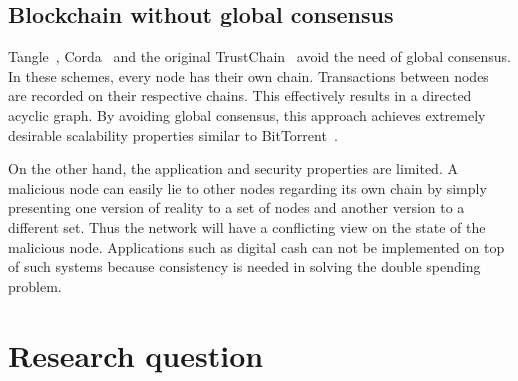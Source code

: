 \subsection{Blockchain without global consensus}

Tangle~\cite{tangle}, Corda~\cite{corda} and the original TrustChain~\cite{multichain} avoid the need of global consensus.
In these schemes, every node has their own chain.
Transactions between nodes are recorded on their respective chains.
This effectively results in a directed acyclic graph.
By avoiding global consensus, this approach achieves extremely desirable scalability properties similar to BitTorrent~\cite{cohen2003incentives}.

On the other hand, the application and security properties are limited.
A malicious node can easily lie to other nodes regarding its own chain by simply presenting one version of reality to a set of nodes and another version to a different set.
Thus the network will have a conflicting view on the state of the malicious node.
Applications such as digital cash can not be implemented on top of such systems because consistency is needed in solving the double spending problem.



\section{Research question}
\label{sec:research-question}

